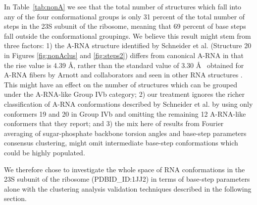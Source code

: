 In  Table~\ref{tab:nonA} we see  that the  total number  of structures
which  fall into  any of  the four  conformational groups  is  only 31
percent  of the  total  number of  steps  in the  23S  subunit of  the
ribosome,  meaning that  69 percent  of  base steps  fall outside  the
conformational groupings. We believe this result might stem from three
factors:   1)  the   A-RNA  structure   identified  by   Schneider  et
al. (Structure 20  in Figures \ref{fig:nonAclus} and \ref{fig:steps2})
differs  from canonical  A-RNA in  that the  rise value  is  4.39 \AA,
rather than the standard value  of 3.30 \AA~ obtained for A-RNA fibers
by Arnott  and collaborators \cite{arnott1973}  and seen in  other RNA
structures \cite{chandrasekar1989}.  This might  have an effect on the
number of structures  which can be grouped under  the A-RNA-like Group
IVb category;  2) our treatment  ignores the richer  classification of
A-RNA     conformations    described     by    Schneider     et    al.
\cite{schneider2004} by using  only conformers 19 and 20  in Group IVb
and omitting the remaining  12 A-RNA-like conformers that they report;
and  3)   the  mix   here  of  results   from  Fourier   averaging  of
sugar-phosphate  backbone  torsion  angles  and  base-step  parameters
consensus clustering, might  omit intermediate base-step conformations
which could be highly populated.

We therefore chose to investigate the whole space of RNA conformations
in  the 23S  subunit  of  the ribosome  (PDBID\_ID:1JJ2)  in terms  of
base-step  parameters alone  with the  clustering  analysis validation
techniques described in the following section.

